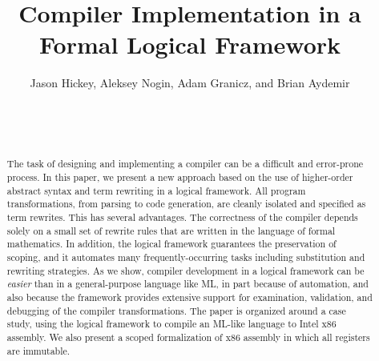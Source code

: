\documentclass{acm_proc_article-sp}
\begin{document}
\title{Compiler Implementation in a Formal Logical Framework
}


\author{
\alignauthor Jason Hickey, Aleksey Nogin, Adam Granicz, and Brian Aydemir
\\
\\
\\
\\
}
\maketitle

\begin{abstract}
The task of designing and implementing a compiler can be a
difficult and error-prone process.  In this paper, we present a new
approach based on the use of higher-order abstract syntax and term
rewriting in a logical framework.  All program transformations, from
parsing to code generation, are cleanly isolated and specified as term
rewrites.  This has several advantages.  The correctness of the
compiler depends solely on a small set of rewrite rules that are
written in the language of formal mathematics.  In addition, the logical
framework guarantees the preservation of scoping, and it automates
many frequently-occurring tasks including substitution and rewriting
strategies.  As we show, compiler development in a logical framework
can be \emph{easier} than in a general-purpose language like ML, in
part because of automation, and also because the framework provides
extensive support for examination, validation, and debugging of the
compiler transformations.  The paper is organized around a case study,
using the \MetaPRL{} logical framework to compile an ML-like language to
Intel x86 assembly.  We also present a scoped formalization of x86
assembly in which all registers are immutable.

\end{abstract}

\sloppy
\raggedbottom
\renewcommand{\floatpagefraction}{0.9}






\printindex
\balancecolumns
\end{document}
